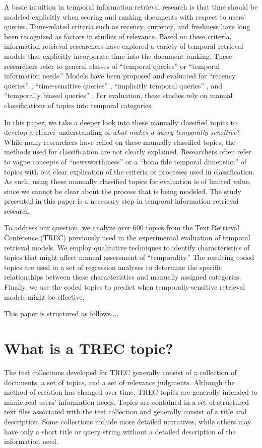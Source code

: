 \documentclass[runningheads,a4paper]{llncs}
\begin{document}
A basic intuition in temporal information retrieval research is that time should be modeled explicitly when scoring and ranking documents with respect to users' queries. Time-related criteria such as recency, currency, and freshness have long been recognized as factors in studies of relevance\cite{Barry1998}. Based on these criteria, information retrieval researchers have explored a variety of temporal retrieval models \cite{Li2003,Efron2011,Dakka2012} that explicitly incorporate time into the document ranking. These researchers refer to general classes of ``temporal queries'' or ``temporal information needs.''  Models have been proposed and evaluated for ``recency queries'' \cite{Li2003,Efron2011}, ``time-sensitive queries'' \cite{Dakka2012}, ``implicitly temporal queries'' \cite{Metzler2009}, and ``temporally biased queries'' \cite{Jones2007}. For evaluation, these studies rely on manual classifications of topics into temporal categories.

In this paper, we take a deeper look into these manually classified topics to develop a clearer understanding of \emph{what makes a query temporally sensitive}? While many researchers have relied on these manually classified topics, the methods used for classification are not clearly explained.  Researchers often refer to vague concepts of ``newsworthiness'' or a ``bona fide temporal dimension'' of topics with out clear explication of the criteria or processes used in classification. As such, using these manually classified topics for evaluation is of limited value, since we cannot be clear about the process that is being modeled. The study presented in this paper is a necessary step in temporal information retrieval research.

To address our question, we analyze over 600 topics from the Text Retrieval Conference (TREC) previously used in the experimental evaluation of temporal retrieval models. We employ qualitative techniques to identify characteristics of topics that might affect manual assessment of ``temporality.'' The resulting coded topics are used in a set of regression analyses to determine the specific relationships between these characteristics and manually assigned categories. Finally, we use the coded topics to predict when temporally-sensitive retrieval models might be effective.

This paper is structured as follows....

\section{What is a TREC topic?}
The test collections developed for TREC generally consist of a collection of documents, a set of topics, and a set of relevance judgments. Although the method of creation has changed over time, TREC topics are generally intended to mimic real users' information needs. Topics are contained in a set of structured text files associated with the test collection and generally consist of a title and description. Some collections include more detailed narratives, while others may have only a short title or query string without a detailed description of the information need.
\end{document}

